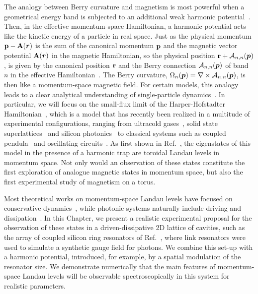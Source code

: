 The analogy between Berry curvature and magnetism is most powerful
when a geometrical energy band is subjected to an additional weak
harmonic potential~\cite{price2014magnetic}. Then, in the effective
momentum-space Hamiltonian, a harmonic potential acts like the kinetic
energy of a particle in real space. Just as the physical momentum
$\mathbf{p}-\mathbf{A}(\bm{r})$ is the sum of the canonical momentum $\mathbf{p}$ and
the magnetic vector potential $\mathbf{A} (\bm{r})$ in the magnetic
Hamiltonian, so the physical position $\mathbf{r}+\mathcal{A}_{n,n}(\bm{p})$,
is given by the canonical position $\mathbf{r}$ and the Berry connection
$\mathcal{A}_{n,n}(\bm{p})$ of band $n$ in the effective
Hamiltonian~\cite{adams1959energy,nagaosa,
murakami2003dissipationless, bliokh2005spin, fujita,
bliokh2005topological,gosselin2006semiclassical}. The Berry curvature,
$\Omega_n (\bm{p})= \nabla \times \mathcal{A}_{n,n}(\bm{p})$, is then like a
momentum-space magnetic field. For certain models, this analogy leads
to a clear analytical understanding of single-particle
dynamics~\cite{price2014magnetic, ozawa2014momhh, price2015sporbit,
Claassen_prl_2015}. In particular, we will focus on the small-flux
limit of the Harper-Hofstadter
Hamiltonian~\cite{harper1955magnetic,hofstadter1976butterfly}, which
is a model that has recently been realized in a multitude of
experimental configurations, ranging from ultracold
gases~\cite{aidelsburger2013hh,miyake2013hh,mancini2015edge,stuhl2015edge},
solid state superlattices~\cite{dean2013hofstadter,yu2014hierarchy}
and silicon photonics~\cite{hafezi2013imaging} to classical systems
such as coupled pendula~\cite{susstrunk2015pendula} and oscillating
circuits~\cite{jia2013circuits}. As first shown in
Ref.~\cite{price2014magnetic}, the eigenstates of this model in the
presence of a harmonic trap are toroidal Landau levels in momentum
space. Not only would an observation of these states constitute the
first exploration of analogue magnetic states in momentum space, but
also the first experimental study of magnetism on a torus.
 
Most theoretical works on momentum-space Landau levels have focused on
conservative dynamics~\cite{price2014magnetic, Claassen_prl_2015},
while photonic systems naturally include driving and
dissipation~\cite{carusotto2013fluids}. In this Chapter, we present a
realistic experimental proposal for the observation of these states in
a driven-dissipative 2D lattice of cavities, such as the array of
coupled silicon ring resonators of Ref.~\cite{hafezi2013imaging},
where link resonators were used to simulate a synthetic gauge field
for photons. We combine this set-up with a harmonic potential,
introduced, for example, by a spatial modulation of the resonator
size. We demonstrate numerically that the main features of
momentum-space Landau levels will be observable spectroscopically in
this system for realistic parameters.

